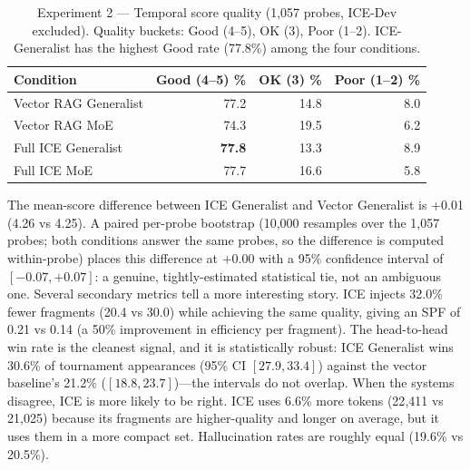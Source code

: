 \documentclass[11pt,a4paper]{article}
\begin{document}
\begin{table}[htbp]
\centering
\small
\caption{Experiment 2 --- Temporal score quality (1,057 probes, ICE-Dev excluded). Quality buckets: Good (4--5), OK (3), Poor (1--2). ICE-Generalist has the highest Good rate (77.8\%) among the four conditions.}
\label{tab:exp2-temporal}
\begin{tabular}{lrrr}
\toprule
\textbf{Condition} & \textbf{Good (4--5) \%} & \textbf{OK (3) \%} & \textbf{Poor (1--2) \%} \\
\midrule
Vector RAG Generalist  & 77.2 & 14.8 & 8.0 \\
Vector RAG MoE         & 74.3 & 19.5 & 6.2 \\
Full ICE Generalist    & \textbf{77.8} & 13.3 & 8.9 \\
Full ICE MoE           & 77.7 & 16.6 & 5.8 \\
\bottomrule
\end{tabular}
\end{table}

The mean-score difference between ICE Generalist and Vector Generalist is +0.01 (4.26 vs 4.25). A paired per-probe bootstrap (10{,}000 resamples over the 1{,}057 probes; both conditions answer the same probes, so the difference is computed within-probe) places this difference at $+0.00$ with a 95\% confidence interval of $[-0.07, +0.07]$: a genuine, tightly-estimated statistical tie, not an ambiguous one. Several secondary metrics tell a more interesting story. ICE injects 32.0\% fewer fragments (20.4 vs 30.0) while achieving the same quality, giving an SPF of 0.21 vs 0.14 (a 50\% improvement in efficiency per fragment). The head-to-head win rate is the cleanest signal, and it is statistically robust: ICE Generalist wins 30.6\% of tournament appearances (95\% CI $[27.9, 33.4]$) against the vector baseline's 21.2\% ($[18.8, 23.7]$)---the intervals do not overlap. When the systems disagree, ICE is more likely to be right. ICE uses 6.6\% more tokens (22{,}411 vs 21{,}025) because its fragments are higher-quality and longer on average, but it uses them in a more compact set. Hallucination rates are roughly equal (19.6\% vs 20.5\%).
\end{document}
